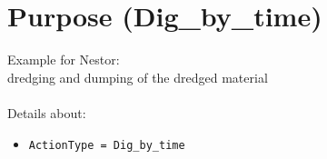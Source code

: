 \clearpage

\newpage
%
\section{Purpose (Dig\_by\_time)}
%
Example for Nestor:\\
dredging and dumping of the dredged material\\
\\
Details about:
\begin{itemize}
\item{\texttt{ActionType = Dig\_by\_time}}
\end{itemize}




